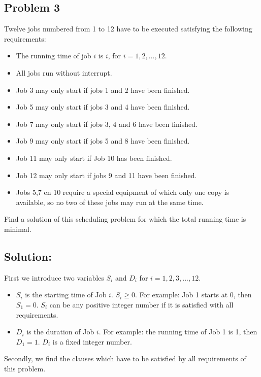 \documentclass[11pt]{article}
\begin{document}
\subsection*{Problem 3}

Twelve jobs numbered from 1 to 12 have to be executed satisfying the following requirements:
\begin{itemize}
  \item The running time of job $i$ is $i$, for $i = 1, 2, . . . , 12$.
  \item All jobs run without interrupt.
  \item Job 3 may only start if jobs 1 and 2 have been finished.
  \item Job 5 may only start if jobs 3 and 4 have been finished.
  \item Job 7 may only start if jobs 3, 4 and 6 have been finished.
  \item Job 9 may only start if jobs 5 and 8 have been finished.
  \item Job 11 may only start if Job 10 has been finished.
  \item Job 12 may only start if jobs 9 and 11 have been finished.
  \item Jobs 5,7 en 10 require a special equipment of which only one copy is available, so no two of these jobs may run at the same time.
\end{itemize}
Find a solution of this scheduling problem for which the total running time is minimal.

\vspace{4mm}

\subsection*{Solution:}
First we introduce two variables $S_{i}$ and $D_{i}$ for $i = 1,2,3,...,12$.
\begin{itemize}
  \item $S_{i}$ is the starting time of Job $i$. $S_{i} \geq 0$. For example: Job 1 starts at 0, then $S_{1} = 0$. $S_{i}$ can be any positive integer number if it is satisfied with all requirements.
  \item $D_{i}$ is the duration of Job $i$. For example: the running time of Job 1 is 1, then $D_{1} = 1$. $D_{i}$ is a fixed integer number.
\end{itemize}

Secondly, we find the clauses which have to be satisfied by  all requirements of this problem.
\end{document}
